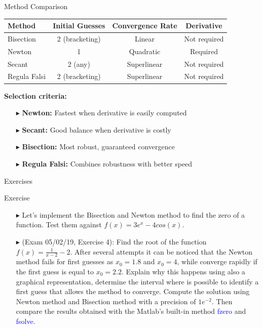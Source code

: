 \documentclass[aspectratio=169]{beamer}
\begin{document}
\begin{frame}{Method Comparison}
    \begin{center}
    \small
    \begin{tabular}{lccc}
        \toprule
        \textbf{Method} & \textbf{Initial Guesses} & \textbf{Convergence Rate} & \textbf{Derivative} \\
        \midrule
        Bisection & 2 (bracketing) & Linear & Not required \\
        Newton & 1 & Quadratic & Required \\
        Secant & 2 (any) & Superlinear & Not required \\
        Regula Falsi & 2 (bracketing) & Superlinear & Not required \\
        \bottomrule
    \end{tabular}
    \end{center}
    
    \vspace{1em}
    
    \textcolor{accentcolor}{\textbf{Selection criteria:}}
    \begin{itemize}
        \item[$\blacktriangleright$] \textbf{Newton:} Fastest when derivative is easily computed
        \item[$\blacktriangleright$] \textbf{Secant:} Good balance when derivative is costly
        \item[$\blacktriangleright$] \textbf{Bisection:} Most robust, guaranteed convergence
        \item[$\blacktriangleright$] \textbf{Regula Falsi:} Combines robustness with better speed
    \end{itemize}
\end{frame}

{
    \begin{frame}[standout]
        Exercises
    \end{frame}
}

\begin{frame}{Exercise}
    \begin{itemize}
        \item[$\blacktriangleright$]
        Let's implement the \alert{Bisection} and \alert{Newton} method to find the zero of a function. Test them against $f(x) = 3e^{x} - 4cos(x)$.
        
        \item[$\blacktriangleright$]
        (Exam 05/02/19, Exercise 4): Find the root of the function $f(x) = \frac{1}{x-2} - 2$. After several attempts it can be noticed that the Newton method fails for first guesses as $x_{0} = 1.8$ and $x_{0} = 4$, while converge rapidly if the first guess is equal to $x_{0} = 2.2$. Explain why this happens using also a graphical representation, determine the interval where is possible to identify a first guess that allows the method to converge. Compute the solution using Newton method and Bisection method with a precision of $1e^{-2}$. Then compare the results obtained with the Matlab's built-in method \textcolor{blue}{fzero} and \textcolor{blue}{fsolve}.
    \end{itemize}
\end{frame}
\end{document}
